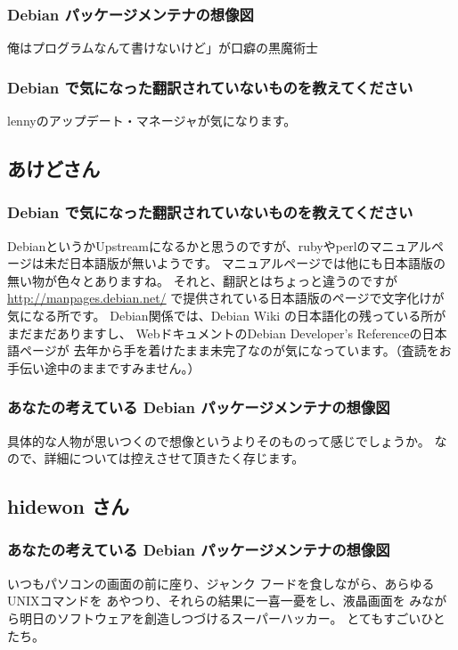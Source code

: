 \documentclass[mingoth,a4paper]{jsarticle}
\begin{document}
\subsubsection{Debian パッケージメンテナの想像図}
俺はプログラムなんて書けないけど」が口癖の黒魔術士

\subsubsection{Debian で気になった翻訳されていないものを教えてください}
lennyのアップデート・マネージャが気になります。

\subsection{あけどさん}
\subsubsection{Debian で気になった翻訳されていないものを教えてください}
DebianというかUpstreamになるかと思うのですが、rubyやperlのマニュアルページは未だ日本語版が無いようです。
マニュアルページでは他にも日本語版の無い物が色々とありますね。
それと、翻訳とはちょっと違うのですが
\url{http://manpages.debian.net/} で提供されている日本語版のページで文字化けが気になる所です。
Debian関係では、Debian Wiki の日本語化の残っている所がまだまだありますし、
WebドキュメントのDebian Developer's Referenceの日本語ページが
去年から手を着けたまま未完了なのが気になっています。（査読をお手伝い途中のままですみません。）

\subsubsection{あなたの考えている Debian パッケージメンテナの想像図}
具体的な人物が思いつくので想像というよりそのものって感じでしょうか。
なので、詳細については控えさせて頂きたく存じます。


\subsection{hidewon さん}
\subsubsection{あなたの考えている Debian パッケージメンテナの想像図}

いつもパソコンの画面の前に座り、ジャンク
フードを食しながら、あらゆるUNIXコマンドを
あやつり、それらの結果に一喜一憂をし、液晶画面を
みながら明日のソフトウェアを創造しつづけるスーパーハッカー。
とてもすごいひとたち。
\end{document}
